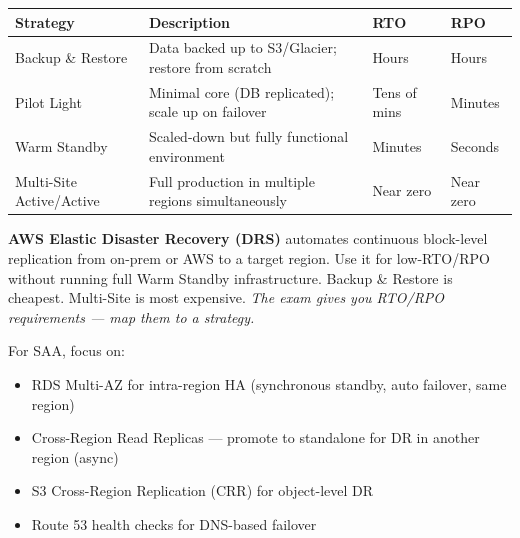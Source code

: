 \begin{comparebox}[title={DR Strategies}]
\begin{tabular}{@{}p{3.2cm}p{4cm}p{1.8cm}p{1.8cm}@{}}
\toprule
\textbf{Strategy} & \textbf{Description} & \textbf{RTO} & \textbf{RPO} \\
\midrule
Backup \& Restore    & Data backed up to S3/Glacier; restore from scratch    & Hours         & Hours        \\
Pilot Light          & Minimal core (DB replicated); scale up on failover     & Tens of mins  & Minutes      \\
Warm Standby         & Scaled-down but fully functional environment           & Minutes       & Seconds      \\
Multi-Site Active/Active & Full production in multiple regions simultaneously & Near zero     & Near zero    \\
\bottomrule
\end{tabular}
\end{comparebox}

\begin{examtip}
\textbf{AWS Elastic Disaster Recovery (DRS)} automates continuous block-level replication from on-prem or AWS to a target region. Use it for low-RTO/RPO without running full Warm Standby infrastructure.
Backup \& Restore is cheapest. Multi-Site is most expensive. \emph{The exam gives you RTO/RPO requirements — map them to a strategy.}
\end{examtip}

\begin{saadepth}
For SAA, focus on:
\begin{itemize}
  \item RDS Multi-AZ for intra-region HA (synchronous standby, auto failover, same region)
  \item Cross-Region Read Replicas — promote to standalone for DR in another region (async)
  \item S3 Cross-Region Replication (CRR) for object-level DR
  \item Route 53 health checks for DNS-based failover
\end{itemize}
\end{saadepth}

